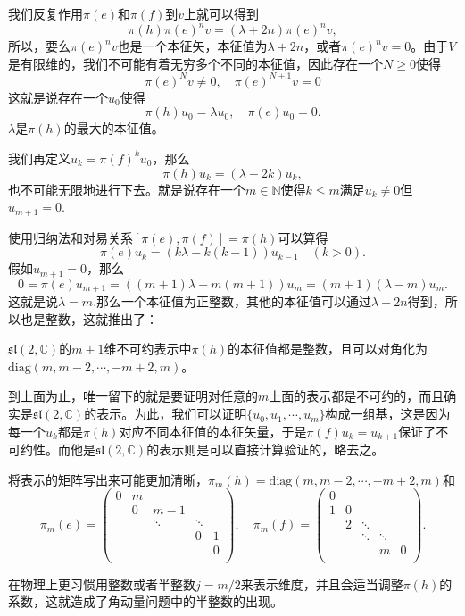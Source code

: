我们反复作用$\pi(e)$和$\pi(f)$到$v$上就可以得到
\[
	\pi(h)\pi(e)^nv=(\lambda+2n)\pi(e)^nv,
\]
所以，要么$\pi(e)^nv$也是一个本征矢，本征值为$\lambda+2n$，或者$\pi(e)^nv=0$。由于$V$是有限维的，我们不可能有着无穷多个不同的本征值，因此存在一个$N\geq 0$使得
\[
	\pi(e)^Nv\neq 0,\quad \pi(e)^{N+1}v=0
\]
这就是说存在一个$u_0$使得
\[
	\pi(h)u_0=\lambda u_0,\quad \pi(e)u_0=0.
\]
$\lambda$是$\pi(h)$的最大的本征值。

我们再定义$u_k=\pi(f)^ku_0$，那么
\[
	\pi(h)u_k=(\lambda-2k) u_k,
\]
也不可能无限地进行下去。就是说存在一个$m\in \mathbb{N}$使得$k\leq m$满足$u_k\neq 0$但$u_{m+1}=0$.

使用归纳法和对易关系$[\pi(e),\pi(f)]=\pi(h)$可以算得
\[
\pi(e)u_k=(k\lambda -k(k-1)) u_{k-1}\quad (k>0).
\]
假如$u_{m+1}=0$，那么
\[
0=\pi(e)u_{m+1}=((m+1)\lambda -m(m+1)) u_{m}=(m+1)(\lambda-m)u_{m}.
\]
这就是说$\lambda=m$.那么一个本征值为正整数，其他的本征值可以通过$\lambda-2n$得到，所以也是整数，这就推出了：

\pro
$\mathfrak{sl}(2,\mathbb{C})$的$m+1$维不可约表示中$\pi(h)$的本征值都是整数，且可以对角化为$\mathrm{diag}(m,m-2,\cdots,-m+2,m)$。

到上面为止，唯一留下的就是要证明对任意的$m$上面的表示都是不可约的，而且确实是$\mathfrak{sl}(2,\mathbb{C})$的表示。为此，我们可以证明$\{u_0,u_1,\cdots,u_m\}$构成一组基，这是因为每一个$u_k$都是$\pi(h)$对应不同本征值的本征矢量，于是$\pi(f)u_k=u_{k+1}$保证了不可约性。而他是$\mathfrak{sl}(2,\mathbb{C})$的表示则是可以直接计算验证的，略去之。

将表示的矩阵写出来可能更加清晰，$\pi_m(h)=\mathrm{diag}(m,m-2,\cdots,-m+2,m)$和
\[
\pi_m(e)=\begin{pmatrix}
	0&m&&&\\
	&0&m-1&&\\
	&&\ddots&\ddots&\\
	&&&0&1\\
	&&&&0\\
\end{pmatrix},\quad
\pi_m(f)=\begin{pmatrix}
	0&&&&\\
	1&0&&&\\
	&2&\ddots&&\\
	&&\ddots&\ddots&\\
	&&&m&0\\
\end{pmatrix}.
\]

在物理上更习惯用整数或者半整数$j=m/2$来表示维度，并且会适当调整$\pi(h)$的系数，这就造成了角动量问题中的半整数的出现。

